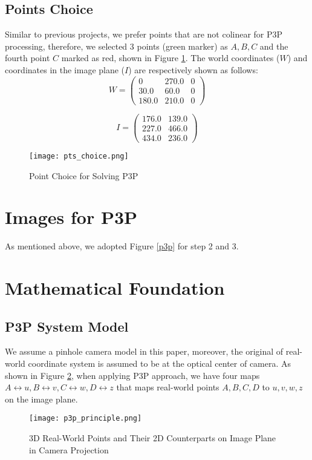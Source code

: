 \documentclass[conference]{IEEEtran}
\begin{document}
\subsection{Points Choice}
Similar to previous projects, we prefer points that are not colinear for P3P processing, therefore, we selected 3 points (green marker) as $A, B, C$ and the fourth point $C$ marked as red, shown in Figure \ref{pts_choice}. The world coordinates ($W$) and coordinates in the image plane ($I$) are respectively shown as follows:
\begin{equation}
	W = \left(\begin{array}{ccc} 0 & 270.0 & 0\\ 30.0 & 60.0 & 0\\ 180.0 & 210.0 & 0 \end{array}\right)
\end{equation}

\begin{equation}
	I = \left(\begin{array}{ccc} 176.0 & 139.0\\ 227.0 & 466.0\\ 434.0 & 236.0 \end{array}\right)
\end{equation}

\begin{figure}
  \centering \texttt{[image: pts\_choice.png]}
  \caption{Point Choice for Solving P3P}
  \label{pts_choice}
\end{figure}

\section{Images for P3P}
As mentioned above, we adopted Figure \ref{p3p} for step 2 and 3.

\section{Mathematical Foundation}
\subsection{P3P System Model}
We assume a pinhole camera model in this paper, moreover, the original of real-world coordinate system is assumed to be at the optical center of camera. As shown in Figure \ref{principle}, when applying P3P approach, we have four maps $A\leftrightarrow u, B\leftrightarrow v, C\leftrightarrow w, D\leftrightarrow z$ that maps real-world points $A, B, C, D$ to $u, v, w, z$ on the image plane. 
\begin{figure}
  \centering \texttt{[image: p3p\_principle.png]}
  \caption{3D Real-World Points and Their 2D Counterparts on Image Plane in Camera Projection}
  \label{principle}
\end{figure}
\end{document}
